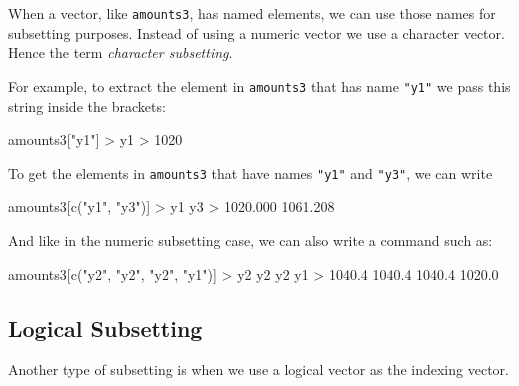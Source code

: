 \documentclass[
]{book}
\newenvironment{Shaded}{\begin{snugshade}}{\end{snugshade}}
\newcommand{\DecValTok}[1]{\textcolor[rgb]{0.00,0.00,0.81}{#1}}
\newcommand{\FloatTok}[1]{\textcolor[rgb]{0.00,0.00,0.81}{#1}}
\newcommand{\FunctionTok}[1]{\textcolor[rgb]{0.00,0.00,0.00}{#1}}
\newcommand{\NormalTok}[1]{#1}
\newcommand{\SpecialCharTok}[1]{\textcolor[rgb]{0.00,0.00,0.00}{#1}}
\newcommand{\StringTok}[1]{\textcolor[rgb]{0.31,0.60,0.02}{#1}}
\begin{document}
When a vector, like \texttt{amounts3}, has named elements, we can use those names for
subsetting purposes. Instead of using a numeric vector we use a character
vector. Hence the term \emph{character subsetting}.

For example, to extract the element in \texttt{amounts3} that has name \texttt{"y1"} we pass
this string inside the brackets:

\begin{Shaded}
\begin{Highlighting}[]
\NormalTok{amounts3[}\StringTok{"y1"}\NormalTok{]}
\SpecialCharTok{\textgreater{}}\NormalTok{   y1 }
\SpecialCharTok{\textgreater{}} \DecValTok{1020}
\end{Highlighting}
\end{Shaded}

To get the elements in \texttt{amounts3} that have names \texttt{"y1"} and \texttt{"y3"}, we can
write

\begin{Shaded}
\begin{Highlighting}[]
\NormalTok{amounts3[}\FunctionTok{c}\NormalTok{(}\StringTok{"y1"}\NormalTok{, }\StringTok{"y3"}\NormalTok{)]}
\SpecialCharTok{\textgreater{}}\NormalTok{       y1       y3 }
\SpecialCharTok{\textgreater{}} \FloatTok{1020.000} \FloatTok{1061.208}
\end{Highlighting}
\end{Shaded}

And like in the numeric subsetting case, we can also write a command such as:

\begin{Shaded}
\begin{Highlighting}[]
\NormalTok{amounts3[}\FunctionTok{c}\NormalTok{(}\StringTok{"y2"}\NormalTok{, }\StringTok{"y2"}\NormalTok{, }\StringTok{"y2"}\NormalTok{, }\StringTok{"y1"}\NormalTok{)]}
\SpecialCharTok{\textgreater{}}\NormalTok{     y2     y2     y2     y1 }
\SpecialCharTok{\textgreater{}} \FloatTok{1040.4} \FloatTok{1040.4} \FloatTok{1040.4} \FloatTok{1020.0}
\end{Highlighting}
\end{Shaded}

\hypertarget{logical-subsetting}{%
\subsection{Logical Subsetting}\label{logical-subsetting}}

Another type of subsetting is when we use a logical vector as the indexing
vector.
\end{document}
